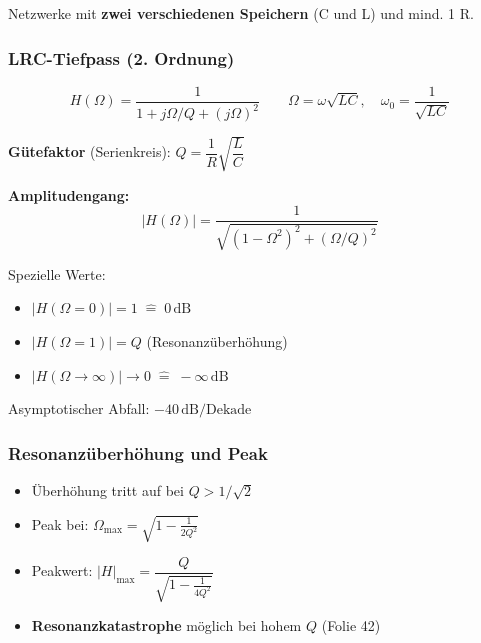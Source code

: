 \documentclass[a4paper,12pt]{article}
\begin{document}
	Netzwerke mit \textbf{zwei verschiedenen Speichern} (C und L) und mind. 1 R.
	
	\subsubsection{LRC-Tiefpass (2. Ordnung)}
	
	
	\begin{equation}
		H(\Omega) = \frac{1}{1 + j\Omega/Q + (j\Omega)^2}
		\qquad \Omega = \omega\sqrt{LC},\quad \omega_0 = \frac{1}{\sqrt{LC}}
	\end{equation}
	
	\textbf{Gütefaktor} (Serienkreis): $Q = \dfrac{1}{R}\sqrt{\dfrac{L}{C}}$
	
	\textbf{Amplitudengang:}
	\begin{equation}
		|H(\Omega)| = \frac{1}{\sqrt{(1-\Omega^2)^2 + (\Omega/Q)^2}}
	\end{equation}
	
	Spezielle Werte:
	\begin{itemize}
		\item $|H(\Omega=0)| = 1 \;\widehat{=}\; 0\,\text{dB}$
		\item $|H(\Omega=1)| = Q$ \quad (Resonanzüberhöhung)
		\item $|H(\Omega\to\infty)| \to 0 \;\widehat{=}\; -\infty\,\text{dB}$
	\end{itemize}
	
	Asymptotischer Abfall: $-40\,\text{dB/Dekade}$
	
	
	\subsubsection*{Resonanzüberhöhung und Peak}
	\begin{itemize}
		\item Überhöhung tritt auf bei $Q > 1/\sqrt{2}$
		\item Peak bei: $\Omega_\text{max} = \sqrt{1 - \frac{1}{2Q^2}}$
		\item Peakwert: $|H|_\text{max} = \dfrac{Q}{\sqrt{1 - \frac{1}{4Q^2}}}$
		\item \textbf{Resonanzkatastrophe} möglich bei hohem $Q$ (Folie 42)
	\end{itemize}
	
\end{document}
